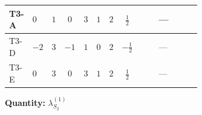 \documentclass[8pt]{article}
\begin{document}
\begin{landscape}
\begin{longtable}{@{}llcccccc >{\raggedright\arraybackslash}p{0.21\linewidth} >{\raggedright\arraybackslash}p{0.21\linewidth} >{\raggedright\arraybackslash}p{0.21\linewidth}@{}}
\midrule
T3-A & $0$ & $1$ & $0$ & $3$ & $1$ & $2$ & $\frac{1}{2}$ & \scriptsize\adjustbox{max width=\linewidth}{$\begin{gathered} +4 {\lambda_{HS_2}^{(1)}}^2\end{gathered}$} & --- & \scriptsize\adjustbox{max width=\linewidth}{$\begin{gathered} +14 {\lambda_{S_2}^{(1)}}^2\end{gathered}$} \\
\midrule
T3-D & $-2$ & $3$ & $-1$ & $1$ & $0$ & $2$ & $-\frac{1}{2}$ & \scriptsize\adjustbox{max width=\linewidth}{$\begin{gathered} +4 {\lambda_{HS_2}^{(1)}}^2\end{gathered}$} & --- & \scriptsize\adjustbox{max width=\linewidth}{$\begin{gathered} +10 {\lambda_{S_2}^{(1)}}^2\end{gathered}$} \\
\midrule
T3-E & $0$ & $3$ & $0$ & $3$ & $1$ & $2$ & $\frac{1}{2}$ & \scriptsize\adjustbox{max width=\linewidth}{$\begin{gathered} +4 {\lambda_{HS_2}^{(1)}}^2\end{gathered}$} & --- & \scriptsize\adjustbox{max width=\linewidth}{$\begin{gathered} +14 {\lambda_{S_2}^{(1)}}^2\end{gathered}$} \\
\midrule
\bottomrule
\end{longtable}
\clearpage
\noindent\textbf{Quantity: }$\lambda_{S_2}^{(1)}$\par\smallskip

\end{landscape}
\end{document}
